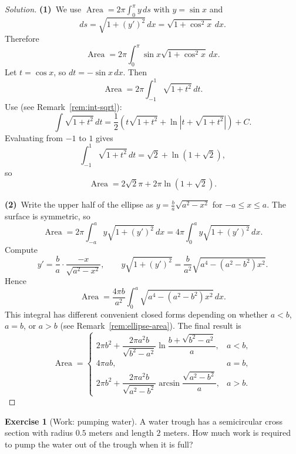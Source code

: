 \documentclass[11pt]{article}
\theoremstyle{definition}
\newtheorem{exercise}{Exercise}[section]
\newenvironment{solution}{\begin{proof}[Solution]}{\end{proof}}
\theoremstyle{remark}
\DeclareMathOperator{\Area}{Area}
\begin{document}
\begin{solution}
\textbf{(1)}\,
We use $\Area=2\pi\int_0^\pi y\,ds$ with $y=\sin x$ and
\[
ds=\sqrt{1+(y')^2}\,dx=\sqrt{1+\cos^2 x}\,dx.
\]
Therefore
\[
\Area=2\pi\int_{0}^{\pi}\sin x\sqrt{1+\cos^2 x}\,dx.
\]
Let $t=\cos x$, so $dt=-\sin x\,dx$. Then
\[
\Area=2\pi\int_{-1}^{1}\sqrt{1+t^2}\,dt.
\]
Use (see Remark~\ref{rem:int-sqrt}):
\[
\int \sqrt{1+t^2}\,dt=\frac{1}{2}\left(t\sqrt{1+t^2}+\ln\left|t+\sqrt{1+t^2}\right|\right)+C.
\]
Evaluating from $-1$ to $1$ gives
\[
\int_{-1}^{1}\sqrt{1+t^2}\,dt=\sqrt{2}+\ln(1+\sqrt{2}),
\]
so
\[
\Area=2\sqrt{2}\pi+2\pi\ln(1+\sqrt{2}).
\]

\textbf{(2)}\,
Write the upper half of the ellipse as $y=\frac{b}{a}\sqrt{a^2-x^2}$ for $-a\le x\le a$.
The surface is symmetric, so
\[
\Area=2\pi\int_{-a}^{a} y\sqrt{1+(y')^2}\,dx
=4\pi\int_{0}^{a} y\sqrt{1+(y')^2}\,dx.
\]
Compute
\[
y'=\frac{b}{a}\cdot\frac{-x}{\sqrt{a^2-x^2}},
\qquad
y\sqrt{1+(y')^2}
=\frac{b}{a^2}\sqrt{a^4-(a^2-b^2)x^2}.
\]
Hence
\[
\Area=\frac{4\pi b}{a^2}\int_{0}^{a}\sqrt{a^4-(a^2-b^2)x^2}\,dx.
\]
This integral has different convenient closed forms depending on whether $a<b$, $a=b$, or $a>b$ (see Remark~\ref{rem:ellipse-area}).
The final result is
\[
\Area=\begin{cases}
2\pi b^2+\dfrac{2\pi a^2b}{\sqrt{b^2-a^2}}\ln\dfrac{b+\sqrt{b^2-a^2}}{a}, & a<b,\\[0.9em]
4\pi ab, & a=b,\\[0.9em]
2\pi b^2+\dfrac{2\pi a^2b}{\sqrt{a^2-b^2}}\arcsin\dfrac{\sqrt{a^2-b^2}}{a}, & a>b.
\end{cases}
\]
\end{solution}

\begin{exercise}[Work: pumping water]
A water trough has a semicircular cross section with radius $0.5$ meters and length $2$ meters.
How much work is required to pump the water out of the trough when it is full?
\end{exercise}
\end{document}
